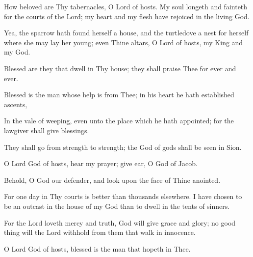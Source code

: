 How beloved are Thy tabernacles, O Lord of hosts. My soul longeth and fainteth for the courts of the Lord; my heart and my flesh have rejoiced in the living God.

Yea, the sparrow hath found herself a house, and the turtledove a nest for herself where she may lay her young; even Thine altars, O Lord of hosts, my King and my God.

Blessed are they that dwell in Thy house; they shall praise Thee for ever and ever.

Blessed is the man whose help is from Thee; in his heart he hath established ascents,

In the vale of weeping, even unto the place which he hath appointed; for the lawgiver shall give blessings.

They shall go from strength to strength; the God of gods shall be seen in Sion.

O Lord God of hosts, hear my prayer; give ear, O God of Jacob.

Behold, O God our defender, and look upon the face of Thine anointed.

For one day in Thy courts is better than thousands elsewhere. I have chosen to be an outcast in the house of my God than to dwell in the tents of sinners.

For the Lord loveth mercy and truth, God will give grace and glory; no good thing will the Lord withhold from them that walk in innocence.

O Lord God of hosts, blessed is the man that hopeth in Thee.
